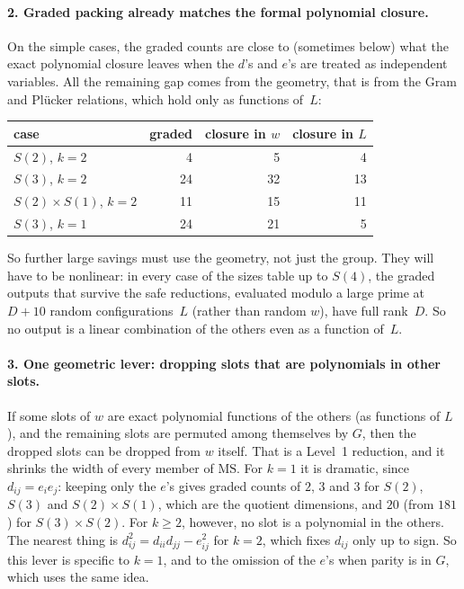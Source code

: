 \documentclass[11pt]{article}
\theoremstyle{definition}
\theoremstyle{remark}
\newcommand{\MS}{\mathrm{MS}}
\begin{document}
\paragraph{2. Graded packing already matches the formal polynomial closure.}
On the simple cases, the graded counts are close to (sometimes below) what the
exact polynomial closure leaves when the $d$'s and $e$'s are treated as
independent variables. All the remaining gap comes from the geometry, that is
from the Gram and Pl\"ucker relations, which hold only as functions of~$L$:
\begin{center}
\begin{tabular}{lrrr}
  case & graded & closure in $w$ & closure in $L$ \\ \hline
  $S(2)$, $k=2$            & 4  & 5  & 4 \\
  $S(3)$, $k=2$            & 24 & 32 & 13 \\
  $S(2)\times S(1)$, $k=2$ & 11 & 15 & 11 \\
  $S(3)$, $k=1$            & 24 & 21 & 5
\end{tabular}
\end{center}
So further large savings must use the geometry, not just the group. They
will have to be nonlinear: in every case of the sizes table up to $S(4)$, the
graded outputs that survive the safe reductions, evaluated modulo a large prime
at $D + 10$ random configurations~$L$ (rather than random $w$), have full
rank~$D$. So no output is a linear combination of the others even as a
function of~$L$.

\paragraph{3. One geometric lever: dropping slots that are polynomials in other slots.}
If some slots of $w$ are exact polynomial functions of the others (as
functions of $L$), and the remaining slots are permuted among themselves by
$G$, then the dropped slots can be dropped from $w$ itself. That is a Level~1
reduction, and it shrinks the width of every member of $\MS$. For $k = 1$ it
is dramatic, since $d_{ij} = e_i e_j$: keeping only the $e$'s gives graded
counts of $2$, $3$ and $3$ for $S(2)$, $S(3)$ and $S(2)\times S(1)$, which are
the quotient dimensions, and $20$ (from $181$) for $S(3)\times S(2)$. For
$k \ge 2$, however, no slot is a polynomial in the others. The nearest thing is
$d_{ij}^2 = d_{ii}d_{jj} - e_{ij}^2$ for $k=2$, which fixes $d_{ij}$ only up to
sign. So this lever is specific to $k = 1$, and to the omission of the $e$'s
when parity is in $G$, which uses the same idea.
\end{document}
